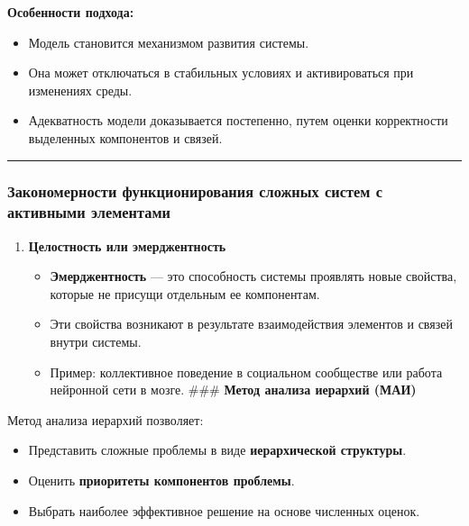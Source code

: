 \documentclass[
]{article}
\providecommand{\tightlist}{%
  \setlength{\itemsep}{0pt}\setlength{\parskip}{0pt}}
\begin{document}
\textbf{Особенности подхода:}

\begin{itemize}
\tightlist
\item
  Модель становится механизмом развития системы.
\item
  Она может отключаться в стабильных условиях и активироваться при
  изменениях среды.
\item
  Адекватность модели доказывается постепенно, путем оценки корректности
  выделенных компонентов и связей.
\end{itemize}

\begin{center}\rule{0.5\linewidth}{0.5pt}\end{center}

\subsubsection{\texorpdfstring{\textbf{Закономерности функционирования
сложных систем с активными
элементами}}{Закономерности функционирования сложных систем с активными элементами}}\label{ux437ux430ux43aux43eux43dux43eux43cux435ux440ux43dux43eux441ux442ux438-ux444ux443ux43dux43aux446ux438ux43eux43dux438ux440ux43eux432ux430ux43dux438ux44f-ux441ux43bux43eux436ux43dux44bux445-ux441ux438ux441ux442ux435ux43c-ux441-ux430ux43aux442ux438ux432ux43dux44bux43cux438-ux44dux43bux435ux43cux435ux43dux442ux430ux43cux438}

\begin{enumerate}
\def\labelenumi{\arabic{enumi}.}
\tightlist
\item
  \textbf{Целостность или эмерджентность}

  \begin{itemize}
  \tightlist
  \item
    \textbf{Эмерджентность} --- это способность системы проявлять новые
    свойства, которые не присущи отдельным ее компонентам.
  \item
    Эти свойства возникают в результате взаимодействия элементов и
    связей внутри системы.
  \item
    Пример: коллективное поведение в социальном сообществе или работа
    нейронной сети в мозге. \#\#\# \textbf{Метод анализа иерархий (МАИ)}
  \end{itemize}
\end{enumerate}

Метод анализа иерархий позволяет:

\begin{itemize}
\tightlist
\item
  Представить сложные проблемы в виде \textbf{иерархической структуры}.
\item
  Оценить \textbf{приоритеты компонентов проблемы}.
\item
  Выбрать наиболее эффективное решение на основе численных оценок.
\end{itemize}
\end{document}

